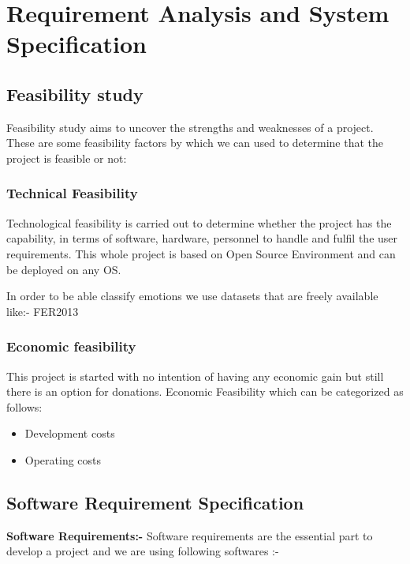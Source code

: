 \chapter{Requirement Analysis and System Specification}
\section{Feasibility study}
Feasibility study aims to uncover the strengths and weaknesses of a project. These are some feasibility factors by which we can used to determine that the project is feasible or not:
\subsection{Technical Feasibility}
Technological feasibility is carried out to determine whether the project has the capability, in terms of software, hardware, personnel to handle and fulfil the user requirements. This whole project is based on Open Source Environment and can be deployed on any OS. 

In order to be able classify emotions we use datasets that are freely available like:- FER2013
\subsection{Economic feasibility}
This project is started with no intention of having any economic gain but still there is an option for donations. Economic Feasibility which can be categorized as follows:
\begin{itemize}
	\item Development costs
	\item Operating costs
\end{itemize}

\section{Software Requirement Specification}
\textbf{Software Requirements:-}  Software requirements are the essential part to develop a project and we are using following softwares :-


